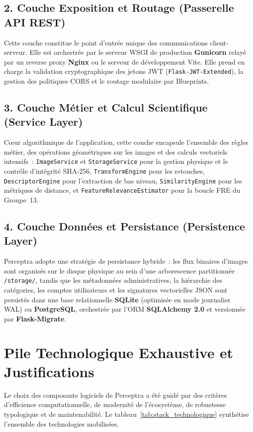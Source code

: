 \subsection{2. Couche Exposition et Routage (Passerelle API REST)}
Cette couche constitue le point d'entrée unique des communications client-serveur. Elle est orchestrée par le serveur WSGI de production \textbf{Gunicorn} relayé par un reverse proxy \textbf{Nginx} ou le serveur de développement Vite. Elle prend en charge la validation cryptographique des jetons JWT (\texttt{Flask-JWT-Extended}), la gestion des politiques CORS et le routage modulaire par Blueprints.

\subsection{3. Couche Métier et Calcul Scientifique (Service Layer)}
C\oe{}ur algorithmique de l'application, cette couche encapsule l'ensemble des règles métier, des opérations géométriques sur les images et des calculs vectoriels intensifs~: \texttt{ImageService} et \texttt{StorageService} pour la gestion physique et le contrôle d'intégrité SHA-256, \texttt{TransformEngine} pour les retouches, \texttt{DescriptorEngine} pour l'extraction de bas niveau, \texttt{SimilarityEngine} pour les métriques de distance, et \texttt{FeatureRelevanceEstimator} pour la boucle FRE du Groupe~13.

\subsection{4. Couche Données et Persistance (Persistence Layer)}
Perceptra adopte une stratégie de persistance hybride~: les flux binaires d'images sont organisés sur le disque physique au sein d'une arborescence partitionnée \texttt{/storage/}, tandis que les métadonnées administratives, la hiérarchie des catégories, les comptes utilisateurs et les signatures vectorielles JSON sont persistés dans une base relationnelle \textbf{SQLite} (optimisée en mode journalier WAL) ou \textbf{PostgreSQL}, orchestrée par l'ORM \textbf{SQLAlchemy 2.0} et versionnée par \textbf{Flask-Migrate}.

\section{Pile Technologique Exhaustive et Justifications}

Le choix des composants logiciels de Perceptra a été guidé par des critères d'efficience computationnelle, de modernité de l'écosystème, de robustesse typologique et de maintenabilité. Le tableau~\ref{tab:stack_technologique} synthétise l'ensemble des technologies mobilisées.

